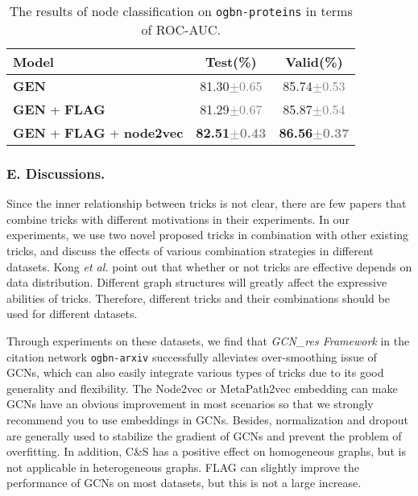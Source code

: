 \documentclass[runningheads]{llncs}
\newcommand{\std}[1]{\textcolor{gray}{\scriptsize{$\pm$#1}}}
\begin{document}
\begin{table}[htbp] 
\caption{The results of node classification on \texttt{ogbn-proteins} in terms of ROC-AUC. }
\label{table:ogbn-proteins}
\begin{center}
\renewcommand\tabcolsep{7.0pt}
\begin{tabular}{l|c|c}
\hline
\textbf{Model}  & \textbf{Test(\%)} & \textbf{Valid(\%)}  \\
\hline
\hline
\textbf{GEN} \cite{li2020deepergcn,li2019deepgcns} & 81.30\std{0.65} & 85.74\std{0.53} \\
\textbf{GEN} + \textbf{FLAG} & 81.29\std{0.67} & 85.87\std{0.54} \\
\textbf{GEN} + \textbf{FLAG} + \textbf{node2vec} & \textbf{82.51\std{0.43}} & \textbf{86.56\std{0.37}} \\
\hline
\end{tabular}
\end{center} 
\end{table}

\subsubsection{E. Discussions.}
Since the inner relationship between tricks is not clear, there are few
papers that combine tricks with different motivations in their
experiments. In our experiments, we use two novel proposed tricks in
combination with other existing tricks, and discuss the
effects of various combination strategies in different datasets.
Kong \textsl{et al.} \cite{kong2020flag} point out that whether or not tricks are effective
depends on data distribution. Different graph structures will
greatly affect the expressive abilities of tricks.
Therefore, different tricks and their combinations should be used for
different datasets.

Through experiments on these datasets, we find that
\textsl{GCN\_res Framework} in the citation network \texttt{ogbn-arxiv}
successfully alleviates over-smoothing issue of GCNs, which can also 
easily integrate various types of tricks due to its good generality and
flexibility. The Node2vec or MetaPath2vec embedding can
make GCNs have an obvious improvement in most scenarios so that we strongly
recommend you to use embeddings in GCNs. Besides, normalization and dropout are
generally used to stabilize the gradient of GCNs and
prevent the problem of overfitting. In addition, C\&S
has a positive effect on homogeneous graphs, but is not applicable in
heterogeneous graphs. FLAG can slightly improve the performance of
GCNs on most datasets, but this is not a large increase.
\end{document}
